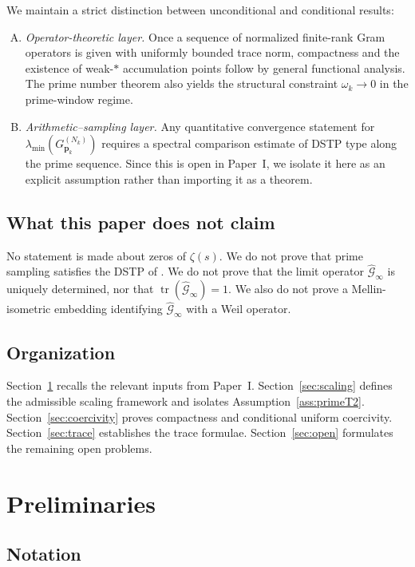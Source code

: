 \documentclass[12pt,a4paper]{amsart}
\theoremstyle{definition}
\newcommand{\GVMk}{G^{(N_k)}_{\mathbf{p}_k}}
\newcommand{\Gcal}{\widehat{\mathcal{G}}}
\begin{document}
We maintain a strict distinction between unconditional and conditional results:

\begin{enumerate}[(A)]
\item \emph{Operator-theoretic layer.} Once a sequence of normalized finite-rank
Gram operators is given with uniformly bounded trace norm, compactness and the
existence of weak-$*$ accumulation points follow by general functional analysis.
The prime number theorem also yields the structural constraint $\omega_k\to0$
in the prime-window regime.
\item \emph{Arithmetic--sampling layer.} Any quantitative convergence statement for
$\lambda_{\min}(\GVMk)$ requires a spectral comparison estimate of DSTP type
along the prime sequence. Since this is open in Paper~I, we isolate it here
as an explicit assumption rather than importing it as a theorem.
\end{enumerate}

\subsection{What this paper does not claim}

No statement is made about zeros of $\zeta(s)$.
We do not prove that prime sampling satisfies the DSTP of \cite{PaperI}.
We do not prove that the limit operator $\Gcal_\infty$ is uniquely determined,
nor that $\operatorname{tr}(\Gcal_\infty)=1$.
We also do not prove a Mellin-isometric embedding identifying
$\Gcal_\infty$ with a Weil operator.

\subsection{Organization}

Section~\ref{sec:prelim} recalls the relevant inputs from Paper~I.
Section~\ref{sec:scaling} defines the admissible scaling framework and isolates
Assumption~\ref{ass:primeT2}.
Section~\ref{sec:coercivity} proves compactness and conditional uniform coercivity.
Section~\ref{sec:trace} establishes the trace formulae.
Section~\ref{sec:open} formulates the remaining open problems.

\section{Preliminaries}\label{sec:prelim}

\subsection{Notation}
\end{document}
